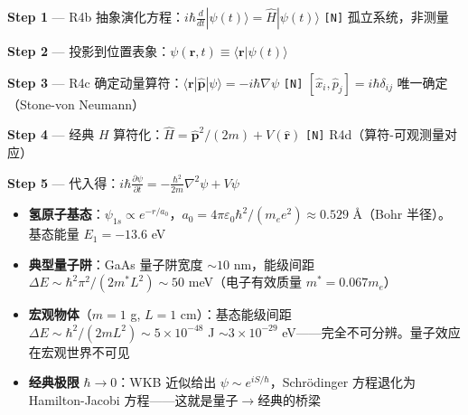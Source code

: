 \begin{derivationbox}[推导]
  \textbf{Step 1} — R4b 抽象演化方程：$i\hbar\frac{d}{dt}|\psi(t)\rangle = \hat{H}|\psi(t)\rangle$
  \hfill\texttt{[N]} 孤立系统，非测量

  \textbf{Step 2} — 投影到位置表象：$\psi(\mathbf{r},t) \equiv \langle\mathbf{r}|\psi(t)\rangle$

  \textbf{Step 3} — R4c 确定动量算符：$\langle\mathbf{r}|\hat{\mathbf{p}}|\psi\rangle = -i\hbar\nabla\psi$
  \hfill\texttt{[N]} $[\hat{x}_i,\hat{p}_j]=i\hbar\delta_{ij}$ 唯一确定（Stone-von Neumann）

  \textbf{Step 4} — 经典 $H$ 算符化：$\hat{H} = \hat{\mathbf{p}}^2/(2m) + V(\hat{\mathbf{r}})$
  \hfill\texttt{[N]} R4d（算符-可观测量对应）

  \textbf{Step 5} — 代入得：$i\hbar\frac{\partial\psi}{\partial t} = -\frac{\hbar^2}{2m}\nabla^2\psi + V\psi$
\end{derivationbox}


\begin{oombox}
  \begin{itemize}
    \item \textbf{氢原子基态}：$\psi_{1s} \propto e^{-r/a_0}$，$a_0 = 4\pi\varepsilon_0\hbar^2/(m_e e^2) \approx 0.529$ \AA{}（Bohr 半径）。基态能量 $E_1 = -13.6$ eV
    \item \textbf{典型量子阱}：GaAs 量子阱宽度 $\sim 10$ nm，能级间距 $\Delta E \sim \hbar^2\pi^2/(2m^*L^2) \sim 50$ meV（电子有效质量 $m^*=0.067m_e$）
    \item \textbf{宏观物体}（$m=1$ g, $L=1$ cm）：基态能级间距 $\Delta E \sim \hbar^2/(2mL^2) \sim 5\times10^{-48}$ J $\sim 3\times10^{-29}$ eV——完全不可分辨。量子效应在宏观世界不可见
    \item \textbf{经典极限} $\hbar \to 0$：WKB 近似给出 $\psi \sim e^{iS/\hbar}$，Schr\"{o}dinger 方程退化为 Hamilton-Jacobi 方程——这就是量子$\to$经典的桥梁
  \end{itemize}
\end{oombox}


